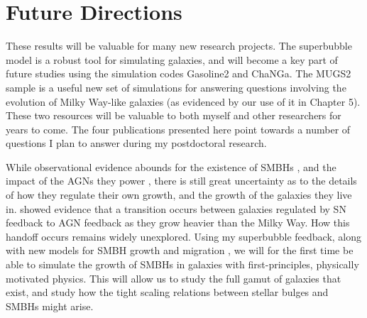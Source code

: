 \section{Future Directions}
These results will be valuable for many new research projects.  The superbubble
model is a robust tool for simulating galaxies, and will become a key part of
future studies using the simulation codes {\sc Gasoline2} and {\sc ChaNGa}.  The
MUGS2 sample is a useful new set of simulations for answering questions
involving the evolution of Milky Way-like galaxies (as evidenced by our use of
it in Chapter 5).  These two resources will be valuable to both myself and other
researchers for years to come. The four publications presented here point
towards a number of questions I plan to answer during my postdoctoral research.  

While observational evidence abounds for the existence of SMBHs
\citep{Kormendy2013}, and the impact of the AGNs they power
\citep{Veilleux2005}, there is still great uncertainty as to the details of how
they regulate their own growth, and the growth of the galaxies they live in.
\citet{Keller2016a} showed evidence that a transition occurs between galaxies
regulated by SN feedback to AGN feedback as they grow heavier than the Milky
Way.  How this handoff occurs remains widely unexplored.  Using my superbubble
feedback, along with new models for SMBH growth \citep{Hopkins2010} and
migration \citep{Tremmel2015}, we will for the first time be able to simulate
the growth of SMBHs in galaxies with first-principles, physically motivated
physics.  This will allow us to study the full gamut of galaxies that exist, and
study how the tight scaling relations between stellar bulges and SMBHs might
arise.

